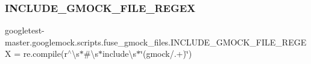 \subsubsection{\texorpdfstring{INCLUDE\_GMOCK\_FILE\_REGEX}{INCLUDE\_GMOCK\_FILE\_REGEX}}
{\footnotesize\ttfamily googletest-\/master.\+googlemock.\+scripts.\+fuse\+\_\+gmock\+\_\+files.\+I\+N\+C\+L\+U\+D\+E\+\_\+\+G\+M\+O\+C\+K\+\_\+\+F\+I\+L\+E\+\_\+\+R\+E\+G\+EX = re.\+compile(r\textquotesingle{}$^\wedge$\textbackslash{}s$\ast$\#\textbackslash{}s$\ast$include\textbackslash{}s$\ast$\char`\"{}(gmock/.+)\char`\"{}\textquotesingle{})}

